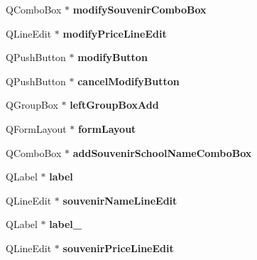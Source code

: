 \begin{DoxyCompactItemize}
\mbox{\label{class_ui__admin_window_a4f9f0a02cab238eb75029f023a3eb919}} 
Q\+Combo\+Box $\ast$ {\bfseries modify\+Souvenir\+Combo\+Box}
\item 
\mbox{\label{class_ui__admin_window_a3a0b823dcae8bff8e9d2e6a4a95a1b4b}} 
Q\+Line\+Edit $\ast$ {\bfseries modify\+Price\+Line\+Edit}
\item 
\mbox{\label{class_ui__admin_window_a004489ba69795d1ac698ffc882a36ab7}} 
Q\+Push\+Button $\ast$ {\bfseries modify\+Button}
\item 
\mbox{\label{class_ui__admin_window_abd89839a96aa4f6d7b24b5c69dbc7433}} 
Q\+Push\+Button $\ast$ {\bfseries cancel\+Modify\+Button}
\item 
\mbox{\label{class_ui__admin_window_a22419259a9ac523116e1b8adb1ce06a7}} 
Q\+Group\+Box $\ast$ {\bfseries left\+Group\+Box\+Add}
\item 
\mbox{\label{class_ui__admin_window_a5b9267c062892513f31a90fc4c444301}} 
Q\+Form\+Layout $\ast$ {\bfseries form\+Layout}
\item 
\mbox{\label{class_ui__admin_window_a4d1adbc6bb6f532633d95563cceca5f8}} 
Q\+Combo\+Box $\ast$ {\bfseries add\+Souvenir\+School\+Name\+Combo\+Box}
\item 
\mbox{\label{class_ui__admin_window_a919d6f5c3587625cbfc8db868f0dd812}} 
Q\+Label $\ast$ {\bfseries label}
\item 
\mbox{\label{class_ui__admin_window_a9a58b2d1001b61d8ce3d0ba106027110}} 
Q\+Line\+Edit $\ast$ {\bfseries souvenir\+Name\+Line\+Edit}
\item 
\mbox{\label{class_ui__admin_window_ac4286e5802f6fd0349abb46b173d57c7}} 
Q\+Label $\ast$ {\bfseries label\+\_}
\item 
\mbox{\label{class_ui__admin_window_a47e02ad80e37eea9e1c0544ef9569300}} 
Q\+Line\+Edit $\ast$ {\bfseries souvenir\+Price\+Line\+Edit}

\end{DoxyCompactItemize}
